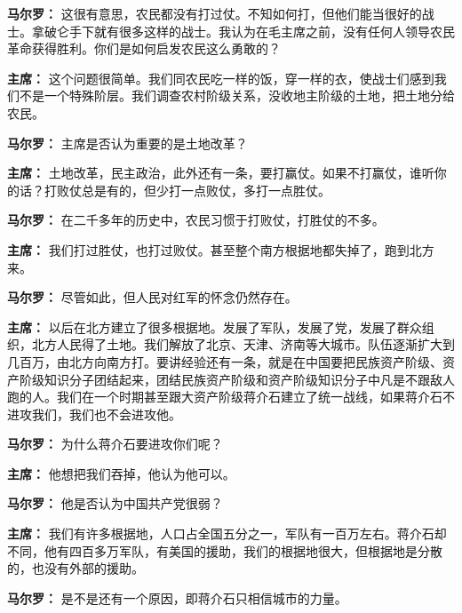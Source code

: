 \begin{list}{}
\item[\textbf{马尔罗：}] 这很有意思，农民都没有打过仗。不知如何打，但他们能当很好的战士。拿破仑手下就有很多这样的战士。我认为在毛主席之前，没有任何人领导农民革命获得胜利。你们是如何启发农民这么勇敢的？

\item[\textbf{主席：}] 这个问题很简单。我们同农民吃一样的饭，穿一样的衣，使战士们感到我们不是一个特殊阶层。我们调查农村阶级关系，没收地主阶级的土地，把土地分给农民。

\item[\textbf{马尔罗：}] 主席是否认为重要的是土地改革？

\item[\textbf{主席：}] 土地改革，民主政治，此外还有一条，要打赢仗。如果不打赢仗，谁听你的话？打败仗总是有的，但少打一点败仗，多打一点胜仗。

\item[\textbf{马尔罗：}] 在二千多年的历史中，农民习惯于打败仗，打胜仗的不多。

\item[\textbf{主席：}] 我们打过胜仗，也打过败仗。甚至整个南方根据地都失掉了，跑到北方来。

\item[\textbf{马尔罗：}] 尽管如此，但人民对红军的怀念仍然存在。

\item[\textbf{主席：}] 以后在北方建立了很多根据地。发展了军队，发展了党，发展了群众组织，北方人民得了土地。我们解放了北京、天津、济南等大城市。队伍逐渐扩大到几百万，由北方向南方打。要讲经验还有一条，就是在中国要把民族资产阶级、资产阶级知识分子团结起来，团结民族资产阶级和资产阶级知识分子中凡是不跟敌人跑的人。我们在一个时期甚至跟大资产阶级蒋介石建立了统一战线，如果蒋介石不进攻我们，我们也不会进攻他。

\item[\textbf{马尔罗：}] 为什么蒋介石要进攻你们呢？

\item[\textbf{主席：}] 他想把我们吞掉，他认为他可以。

\item[\textbf{马尔罗：}] 他是否认为中国共产党很弱？

\item[\textbf{主席：}] 我们有许多根据地，人口占全国五分之一，军队有一百万左右。蒋介石却不同，他有四百多万军队，有美国的援助，我们的根据地很大，但根据地是分散的，也没有外部的援助。

\item[\textbf{马尔罗：}] 是不是还有一个原因，即蒋介石只相信城市的力量。


\end{list}
